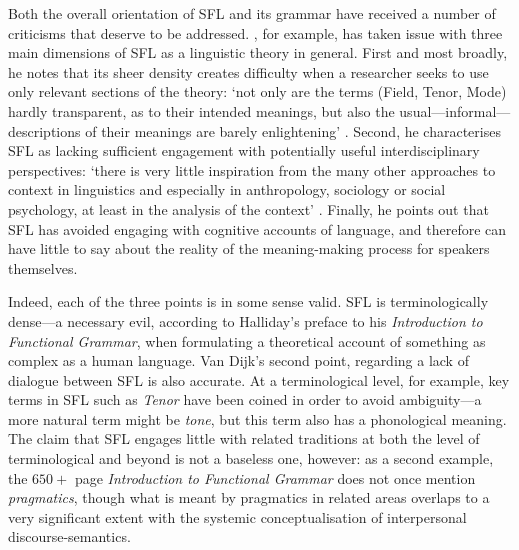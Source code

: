 Both the overall orientation of \gls{SFL} and its grammar have received a number of criticisms that deserve to be addressed. \textcite{van_dijk_text_2004}, for example, has taken issue with three main dimensions of \gls{SFL} as a linguistic theory in general. First and most broadly, he notes that its sheer density creates difficulty when a researcher seeks to use only relevant sections of the theory:  `not only are the terms (Field, Tenor, Mode) hardly transparent, as to their intended meanings, but also the usual---informal---descriptions of their meanings are barely enlightening' \parencite*[p.~341]{van_dijk_text_2004}. Second, he characterises \gls{SFL} as lacking sufficient engagement with potentially useful interdisciplinary perspectives: `there is very little inspiration from the many other approaches to context in linguistics and especially in anthropology, sociology or social psychology, at least in the analysis of the context' \parencite*[p.~342]{van_dijk_text_2004}. Finally, he points out that \gls{SFL} has avoided engaging with cognitive accounts of language, and therefore can have little to say about the reality of the meaning\hyp{}making process for speakers themselves.

Indeed, each of the three points is in some sense valid. \gls{SFL} is terminologically dense---a necessary evil, according to Halliday's preface to his \emph{Introduction to Functional Grammar}, when formulating a theoretical account of something as complex as a human language.  Van Dijk's second point, regarding a lack of dialogue between \gls{SFL} is also accurate. At a terminological level, for example, key terms in \gls{SFL} such as \emph{Tenor} have been coined in order to avoid ambiguity---a more natural term might be \emph{tone}, but this term also has a phonological meaning. The claim that \gls{SFL} engages little with related traditions at both the level of terminological and beyond is not a baseless one, however: as a second example, the $650+$ page \emph{Introduction to Functional Grammar} does not once mention \emph{pragmatics}, though what is meant by pragmatics in related areas overlaps to a very significant extent with the systemic conceptualisation of interpersonal \glspl{discourse-semantic}.

